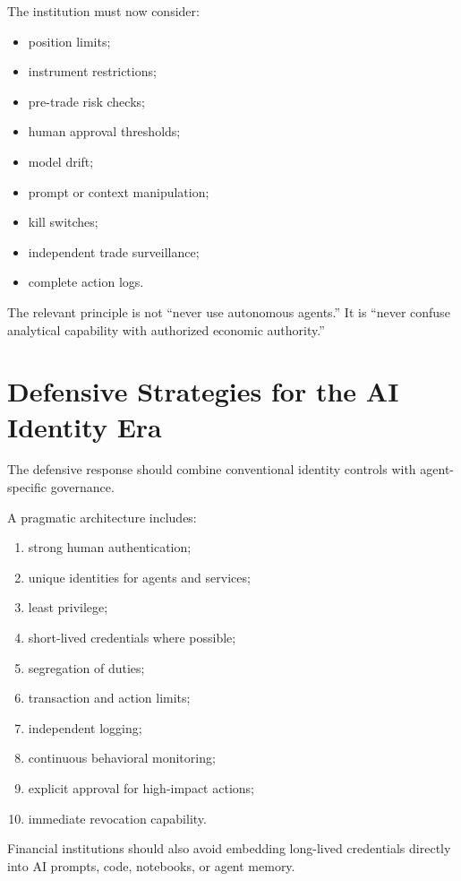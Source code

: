 The institution must now consider:

\begin{itemize}
    \item position limits;
    \item instrument restrictions;
    \item pre-trade risk checks;
    \item human approval thresholds;
    \item model drift;
    \item prompt or context manipulation;
    \item kill switches;
    \item independent trade surveillance;
    \item complete action logs.
\end{itemize}

The relevant principle is not ``never use autonomous agents.'' It is ``never confuse analytical capability with authorized economic authority.''

\section{Defensive Strategies for the AI Identity Era}

The defensive response should combine conventional identity controls with agent-specific governance.

A pragmatic architecture includes:

\begin{enumerate}
    \item strong human authentication;
    \item unique identities for agents and services;
    \item least privilege;
    \item short-lived credentials where possible;
    \item segregation of duties;
    \item transaction and action limits;
    \item independent logging;
    \item continuous behavioral monitoring;
    \item explicit approval for high-impact actions;
    \item immediate revocation capability.
\end{enumerate}

Financial institutions should also avoid embedding long-lived credentials directly into AI prompts, code, notebooks, or agent memory.


